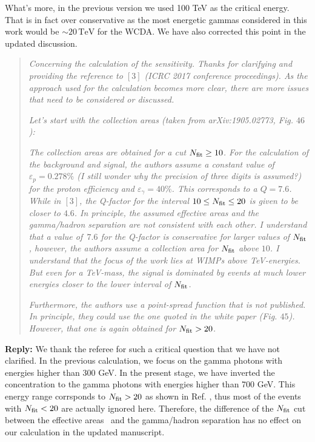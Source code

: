 \documentclass{article}
\def\TeV{\mathrm{TeV}} %
\begin{document}
What's more, in the previous version we used 100 TeV as the critical energy.
That is in fact over conservative as the most energetic gammas considered in this work would be $\sim20\,\TeV$ for the WCDA.
We have also corrected this point in the updated discussion.

\begin{quote}
\emph{Concerning the calculation of the sensitivity. Thanks for clarifying and providing the reference to $[3]$ (ICRC 2017 conference proceedings). As the approach used for the calculation becomes more clear, there are more issues that need to be considered or discussed.}

\emph{Let’s start with the collection areas (taken from arXiv:1905.02773, Fig. $46$):}

\emph{The collection areas are obtained for a cut $N_{\rm fit} \geq 10$. For the calculation of the background and signal, the authors assume a constant value of $\varepsilon_{p} = 0.278\%$ (I still wonder why the precision of three digits is assumed?) for the proton efficiency and $\varepsilon_{\gamma} = 40\%$. This corresponds to a $Q = 7.6$. While in $[3]$, the Q-factor for the interval $10 \leq N_{\rm fit} \leq 20$ is given to be closer to $4.6$. In principle, the assumed effective areas and the gamma/hadron separation are not consistent with each other. I understand that a value of \,$7.6$ for the Q-factor is conservative for larger values of $N_{\rm fit}$ , however, the authors assume a collection area for $N_{\rm fit}$ above $10$. I understand that the focus of the work lies at WIMPs above TeV-energies. But even for a TeV-mass, the signal is dominated by events at much lower energies closer to the lower interval of $N_{\rm fit}$.}

\emph{Furthermore, the authors use a point-spread function that is not published. In principle, they could use the one quoted in the white paper (Fig. $45$). However, that one is again obtained for $N_{\rm fit} > 20$.}
\end{quote}

\textbf{Reply:} We thank the referee for such a critical question that we have not clarified.
In the previous calculation, we focus on the gamma photons with energies higher than 300 GeV.
In the present stage, we have inverted the concentration to the gamma photons with energies higher than 700 GeV.
This energy range corrsponds to $N_{\rm fit} > 20$ as shown in Ref. \cite{Zha:2017vcs}, thus most of the events with $N_{\rm fit} < 20$ are actually ignored here.
Therefore, the difference of the $N_{\rm fit}$ cut between the effective areas~\cite{Bai:2019khm} and the gamma/hadron separation has no effect on our calculation in the updated manuscript.
\end{document}
